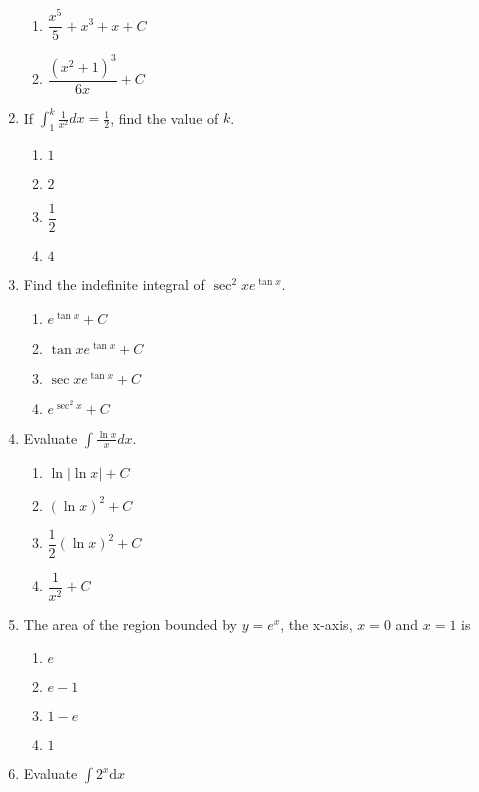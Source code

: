 \begin{multicols}{2}
\begin{enumerate}[label={\arabic*.}]
\begin{enumerate}[label={\Alph*.}]
        \item \( \dfrac{x^5}{5} + x^3 + x + C \)
        \item \( \dfrac{(x^2+1)^3}{6x} + C \)
      \end{enumerate}
    \item If \(\displaystyle \int_{1}^{k} \frac{1}{x^2} dx = \frac{1}{2} \), find the value of \(k\).
      \begin{enumerate}[label={\Alph*.}]
        \item \(1\)
        \item \(2\)
        \item \(\dfrac{1}{2}\)
        \item \(4\)
      \end{enumerate}
    \item Find the indefinite integral of \( \sec^2 x e^{\tan x} \).
      \begin{enumerate}[label={\Alph*.}]
        \item \( e^{\tan x} + C \)
        \item \( \tan x e^{\tan x} + C \)
        \item \( \sec x e^{\tan x} + C \)
        \item \( e^{\sec^2 x} + C \)
      \end{enumerate}
    \item Evaluate \(\displaystyle \int \frac{\ln x}{x} dx \).
      \begin{enumerate}[label={\Alph*.}]
        \item \( \ln| \ln x | + C \)
        \item \( (\ln x)^2 + C \)
        \item \( \dfrac{1}{2}(\ln x)^2 + C \)
        \item \( \dfrac{1}{x^2} + C \)
      \end{enumerate}
    \item The area of the region bounded by \(y = e^x\), the x-axis, \(x=0\) and \(x=1\) is
      \begin{enumerate}[label={\Alph*.}]
        \item \(e\)
        \item \(e-1\)
        \item \(1-e\)
        \item \(1\)
      \end{enumerate}
    \item Evaluate \(\displaystyle \int 2^x \mathrm{d}x\)
      \begin{enumerate}[label={\Alph*.}]

\end{enumerate}
\end{enumerate}
\end{multicols}
